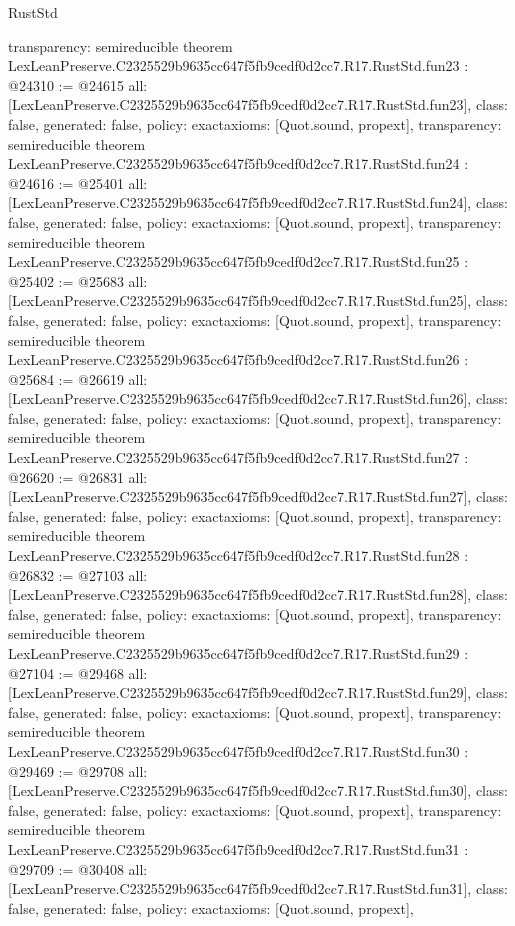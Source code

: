 \begin{lexlean}{RustStd}
\begin{coremodule}
{  transparency: semireducible
}
theorem LexLeanPreserve.C2325529b9635cc647f5fb9cedf0d2cc7.R17.RustStd.fun23 : @24310 := @24615 {
  all: [LexLeanPreserve.C2325529b9635cc647f5fb9cedf0d2cc7.R17.RustStd.fun23],
  class: false,
  generated: false,
  policy: exact{axioms: [Quot.sound, propext]},
  transparency: semireducible
}
theorem LexLeanPreserve.C2325529b9635cc647f5fb9cedf0d2cc7.R17.RustStd.fun24 : @24616 := @25401 {
  all: [LexLeanPreserve.C2325529b9635cc647f5fb9cedf0d2cc7.R17.RustStd.fun24],
  class: false,
  generated: false,
  policy: exact{axioms: [Quot.sound, propext]},
  transparency: semireducible
}
theorem LexLeanPreserve.C2325529b9635cc647f5fb9cedf0d2cc7.R17.RustStd.fun25 : @25402 := @25683 {
  all: [LexLeanPreserve.C2325529b9635cc647f5fb9cedf0d2cc7.R17.RustStd.fun25],
  class: false,
  generated: false,
  policy: exact{axioms: [Quot.sound, propext]},
  transparency: semireducible
}
theorem LexLeanPreserve.C2325529b9635cc647f5fb9cedf0d2cc7.R17.RustStd.fun26 : @25684 := @26619 {
  all: [LexLeanPreserve.C2325529b9635cc647f5fb9cedf0d2cc7.R17.RustStd.fun26],
  class: false,
  generated: false,
  policy: exact{axioms: [Quot.sound, propext]},
  transparency: semireducible
}
theorem LexLeanPreserve.C2325529b9635cc647f5fb9cedf0d2cc7.R17.RustStd.fun27 : @26620 := @26831 {
  all: [LexLeanPreserve.C2325529b9635cc647f5fb9cedf0d2cc7.R17.RustStd.fun27],
  class: false,
  generated: false,
  policy: exact{axioms: [Quot.sound, propext]},
  transparency: semireducible
}
theorem LexLeanPreserve.C2325529b9635cc647f5fb9cedf0d2cc7.R17.RustStd.fun28 : @26832 := @27103 {
  all: [LexLeanPreserve.C2325529b9635cc647f5fb9cedf0d2cc7.R17.RustStd.fun28],
  class: false,
  generated: false,
  policy: exact{axioms: [Quot.sound, propext]},
  transparency: semireducible
}
theorem LexLeanPreserve.C2325529b9635cc647f5fb9cedf0d2cc7.R17.RustStd.fun29 : @27104 := @29468 {
  all: [LexLeanPreserve.C2325529b9635cc647f5fb9cedf0d2cc7.R17.RustStd.fun29],
  class: false,
  generated: false,
  policy: exact{axioms: [Quot.sound, propext]},
  transparency: semireducible
}
theorem LexLeanPreserve.C2325529b9635cc647f5fb9cedf0d2cc7.R17.RustStd.fun30 : @29469 := @29708 {
  all: [LexLeanPreserve.C2325529b9635cc647f5fb9cedf0d2cc7.R17.RustStd.fun30],
  class: false,
  generated: false,
  policy: exact{axioms: [Quot.sound, propext]},
  transparency: semireducible
}
theorem LexLeanPreserve.C2325529b9635cc647f5fb9cedf0d2cc7.R17.RustStd.fun31 : @29709 := @30408 {
  all: [LexLeanPreserve.C2325529b9635cc647f5fb9cedf0d2cc7.R17.RustStd.fun31],
  class: false,
  generated: false,
  policy: exact{axioms: [Quot.sound, propext]},
}
\end{coremodule}
\end{lexlean}
